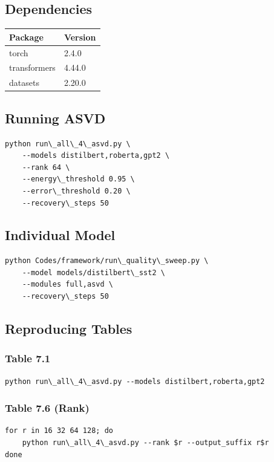 \subsection{Dependencies}

\begin{table}[H]
\centering
\small
\begin{tabular}{ll}
\toprule
\textbf{Package} & \textbf{Version} \\
\midrule
torch & 2.4.0 \\
transformers & 4.44.0 \\
datasets & 2.20.0 \\
\bottomrule
\end{tabular}
\end{table}

\subsection{Running ASVD}

\begin{lstlisting}
python run\_all\_4\_asvd.py \
    --models distilbert,roberta,gpt2 \
    --rank 64 \
    --energy\_threshold 0.95 \
    --error\_threshold 0.20 \
    --recovery\_steps 50
\end{lstlisting}

\subsection{Individual Model}

\begin{lstlisting}
python Codes/framework/run\_quality\_sweep.py \
    --model models/distilbert\_sst2 \
    --modules full,asvd \
    --recovery\_steps 50
\end{lstlisting}

\subsection{Reproducing Tables}

\subsubsection{Table 7.1}
\begin{lstlisting}
python run\_all\_4\_asvd.py --models distilbert,roberta,gpt2
\end{lstlisting}

\subsubsection{Table 7.6 (Rank)}
\begin{lstlisting}
for r in 16 32 64 128; do
    python run\_all\_4\_asvd.py --rank $r --output_suffix r$r
done
\end{lstlisting}

